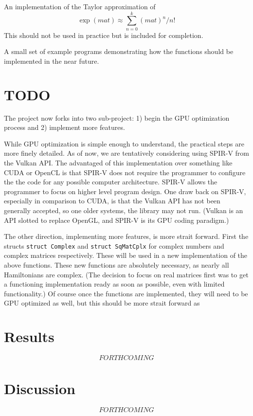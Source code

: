 \documentclass{article}
\theoremstyle{exampstyle} \newtheorem*{remark}{Remark}
\newcommand{\1}{\mathds{1}}
\begin{document}
An implementation of the Taylor approximation of 
$$\exp(mat)\approx\sum_{n=0}^k(mat)^n/n!$$
This should not be used in practice but is included for completion.
\newline

A small set of example programs demonstrating how the functions should be implemented in the near future.

\section{TODO}
The project now forks into two sub-project: 1) begin the GPU optimization process and 2) implement more features.

While GPU optimization is simple enough to understand, the practical steps are more finely detailed. As of now, we are tentatively considering using SPIR-V from the Vulkan API. The advantaged of this implementation over something like CUDA or OpenCL is that SPIR-V does not require the programmer to configure the the code for any possible computer architecture. SPIR-V allows the programmer to focus on higher level program design. One draw back on SPIR-V, especially in comparison to CUDA, is that the Vulkan API has not been generally accepted, so one older systems, the library may not run. (Vulkan is an API slotted to replace OpenGL, and SPIR-V is its GPU coding paradigm.)

The other direction, implementing more features, is more strait forward. First the structs \texttt{struct Complex} and \texttt{struct SqMatCplx} for complex numbers and complex matrices respectively. These will be used in a new implementation of the above functions. These new functions are absolutely necessary, as nearly all Hamiltonians are complex. (The decision to focus on real matrices first was to get a functioning implementation ready as soon as possible, even with limited functionality.) Of course once the functions are implemented, they will need to be GPU optimized as well, but this should be more strait forward as 

\section{Results}

$$ FORTHCOMING $$

\section{Discussion}

$$ FORTHCOMING $$
\end{document}
